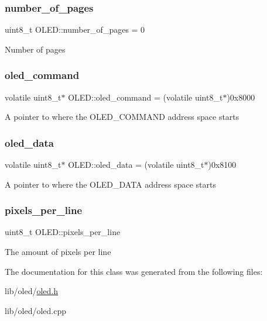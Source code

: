\subsubsection{\texorpdfstring{number\+\_\+of\+\_\+pages}{number\_of\_pages}}
{\footnotesize\ttfamily uint8\+\_\+t O\+L\+E\+D\+::number\+\_\+of\+\_\+pages = 0\hspace{0.3cm}{\ttfamily [protected]}}

Number of pages \hypertarget{class_o_l_e_d_af0a85ccd0274347b8c1ac77d298a14cf}{}\label{class_o_l_e_d_af0a85ccd0274347b8c1ac77d298a14cf} 
\subsubsection{\texorpdfstring{oled\+\_\+command}{oled\_command}}
{\footnotesize\ttfamily volatile uint8\+\_\+t$\ast$ O\+L\+E\+D\+::oled\+\_\+command = (volatile uint8\+\_\+t$\ast$)0x8000\hspace{0.3cm}{\ttfamily [protected]}}

A pointer to where the O\+L\+E\+D\+\_\+\+C\+O\+M\+M\+A\+ND address space starts \hypertarget{class_o_l_e_d_a1bc54d49808f92ddfc354511b692df6f}{}\label{class_o_l_e_d_a1bc54d49808f92ddfc354511b692df6f} 
\subsubsection{\texorpdfstring{oled\+\_\+data}{oled\_data}}
{\footnotesize\ttfamily volatile uint8\+\_\+t$\ast$ O\+L\+E\+D\+::oled\+\_\+data = (volatile uint8\+\_\+t$\ast$)0x8100\hspace{0.3cm}{\ttfamily [protected]}}

A pointer to where the O\+L\+E\+D\+\_\+\+D\+A\+TA address space starts \hypertarget{class_o_l_e_d_a6ddac7b826eccac8c682c5246ef52b29}{}\label{class_o_l_e_d_a6ddac7b826eccac8c682c5246ef52b29} 
\subsubsection{\texorpdfstring{pixels\+\_\+per\+\_\+line}{pixels\_per\_line}}
{\footnotesize\ttfamily uint8\+\_\+t O\+L\+E\+D\+::pixels\+\_\+per\+\_\+line\hspace{0.3cm}{\ttfamily [protected]}}

The amount of pixels per line 

The documentation for this class was generated from the following files\+:\begin{DoxyCompactItemize}
\item 
lib/oled/\hyperlink{oled_8h}{oled.\+h}\item 
lib/oled/oled.\+cpp\end{DoxyCompactItemize}
